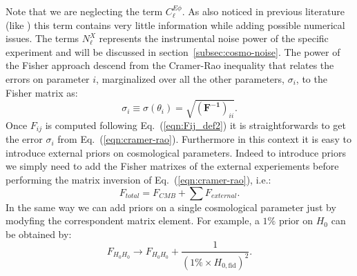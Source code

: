 \documentclass[aps,prd,reprint,superscriptaddress]{revtex4-1}
\newcommand\refeq[1]{Eq.~(\ref{eqn:#1})}
\newcommand{\refssec}[1]{section~\ref{subsec:#1}}
\begin{document}
Note that we are neglecting the term $C_\ell^{E\phi}$. As also noticed in previous literature (like \cite{wu:2014,2013PhRvD..87h3008H}) this term contains very little information while adding possible numerical issues.
The terms $N_\ell^{X}$ represents the instrumental noise power of the specific experiment and will be discussed in \refssec{cosmo-noise}.
The power of the Fisher approach descend from the Cramer-Rao inequality that relates the errors on parameter $i$, marginalized over all the other parameters, $\sigma_i$, to the Fisher matrix as:
\begin{equation}
\sigma_i \equiv \sigma (\theta_i) = \sqrt{(\mathbf{ F^{-1}})_{ii}}.
\label{eqn:cramer-rao}
\end{equation}
Once $F_{ij}$ is computed following \refeq{Fij_def2} it is straightforwards to get the error $\sigma_i$ from \refeq{cramer-rao}. Furthermore in this context it is easy to introduce external priors on cosmological parameters.
Indeed to introduce priors we simply need to add the Fisher matrixes of the external experiements before performing the matrix inversion of \refeq{cramer-rao}, i.e.:
\begin{equation}
F_{total}=F_{CMB}+\sum F_{external}.
\end{equation}
In the same way we can add priors on a single cosmological parameter just by modyfing the correspondent matrix element.
For example, a $1\%$ prior on $H_{0}$ can be obtained by:
\begin{equation}
F_{H_0 H_0} \rightarrow F_{H_0 H_0} + \frac{1}{(1\% \times H_{0,\text{fid}})^2}.
\end{equation}
\end{document}
